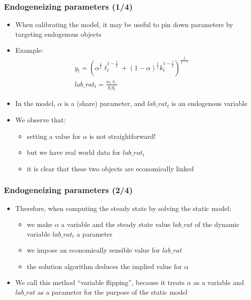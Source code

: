 \documentclass[aspectratio=169]{beamer}
\begin{document}
\begin{frame}
  \frametitle{Endogeneizing parameters (1/4)}
  \begin{itemize}
  \item When calibrating the model, it may be useful to pin down parameters by targeting endogenous objects
  \item Example:
    \begin{gather*}
      y_t = \left(\alpha^{\frac{1}{\xi}} \ell_t^{1-\frac{1}{\xi}} + (1-\alpha)^{\frac{1}{\xi}}k_t^{1-\frac{1}{\xi}}\right)^{\frac{\xi}{\xi - 1}} \\
      lab\_rat_t = \frac{w_t \ell_t}{p_t y_t}
    \end{gather*}
  \item In the model, $\alpha$ is a (share) parameter, and $lab\_rat_t$ is an endogenous variable
  \item We observe that:
    \begin{itemize}
    \item setting a value for $\alpha$ is not straightforward!
    \item but we have real world data for $lab\_rat_t$
    \item it is clear that these two objects are economically linked
    \end{itemize}
  \end{itemize}
\end{frame}

\begin{frame}[fragile=singleslide]
  \frametitle{Endogeneizing parameters (2/4)}
  \begin{itemize}
  \item Therefore, when computing the steady state by solving the static model:
    \begin{itemize}
    \item we make $\alpha$ a variable and the steady state value $lab\_rat$ of the dynamic variable $lab\_rat_t$ a parameter
    \item we impose an economically sensible value for $lab\_rat$
    \item the solution algorithm deduces the implied value for $\alpha$
    \end{itemize}
  \item We call this method ``variable flipping'', because it treats $\alpha$ as a variable and $lab\_rat$ as a parameter for the purpose of the static model
  \end{itemize}
\end{frame}
\end{document}
